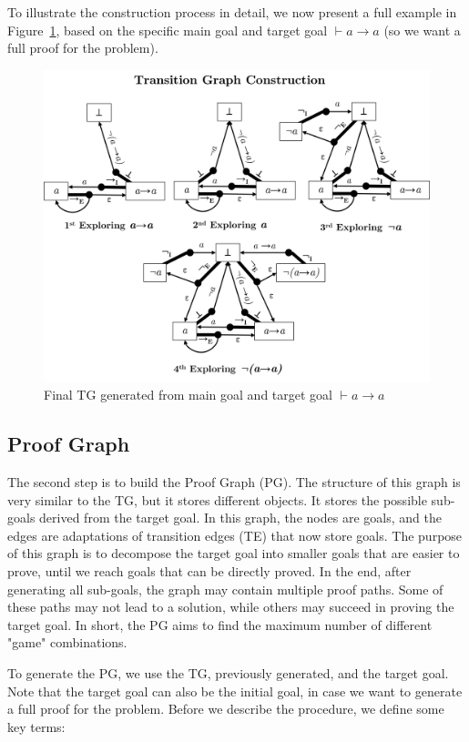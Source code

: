 To illustrate the construction process in detail, we now present a full example in Figure~\ref{fig:tg-final}, based on the specific main goal and target goal \(\vdash a \to a\) (so we want a full proof for the problem).

\begin{figure}
    \centering
    \includegraphics[width=1\linewidth]{resources/tg-final.png}
    \caption{Final TG generated from main goal and target goal \(\vdash a \to a\)}
    \label{fig:tg-final}
\end{figure}

\subsection{Proof Graph}
The second step is to build the Proof Graph (PG). The structure of this graph is very similar to the TG, but it stores different objects. It stores the possible sub-goals derived from the target goal. In this graph, the nodes are goals, and the edges are adaptations of transition edges (TE) that now store goals. The purpose of this graph is to decompose the target goal into smaller goals that are easier to prove, until we reach goals that can be directly proved. In the end, after generating all sub-goals, the graph may contain multiple proof paths. Some of these paths may not lead to a solution, while others may succeed in proving the target goal. In short, the PG aims to find the maximum number of different "game" combinations.

To generate the PG, we use the TG, previously generated, and the target goal. Note that the target goal can also be the initial goal, in case we want to generate a full proof for the problem. Before we describe the procedure, we define some key terms:

